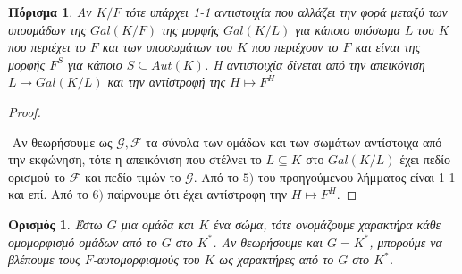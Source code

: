 \documentclass[oneside,a4paper]{article}
\newtheorem*{defn}{Ορισμός}
\newtheorem{cor}{Πόρισμα}
\begin{document}
\begin{cor} Αν $K/F$ τότε υπάρχει 1-1 αντιστοιχία που αλλάζει την φορά μεταξύ των υποομάδων της $Gal(K/F)$ της μορφής $Gal(K/L)$ για κάποιο υπόσωμα $L$ του $K$ που περιέχει το $F$ και των υποσωμάτων του $K$ που περιέχουν το $F$ και είναι της μορφής $F^S$ για κάποιο $S \subseteq Aut(K)$. Η αντιστοιχία δίνεται από την απεικόνιση $L \mapsto Gal(K/L)$ και την αντίστροφή της $H \mapsto F^H$
\end{cor}
\begin{proof} $ $

	$ $\newline
	Αν θεωρήσουμε ως $\mathcal G, \mathcal F$ τα σύνολα των ομάδων και των σωμάτων αντίστοιχα από την εκφώνηση, τότε η απεικόνιση που στέλνει το $L\subseteq K$ στο $Gal(K/L)$ έχει πεδίο ορισμού το $\mathcal F$ και πεδίο τιμών το $\mathcal G$. Από το $5)$ του προηγούμενου λήμματος είναι 1-1 και επί. Από το $6)$ παίρνουμε ότι έχει αντίστροφη την $H \mapsto F^H$.
	
\end{proof}


\begin{defn}
	Έστω $G$ μια ομάδα και $K$ ένα σώμα, τότε ονομάζουμε χαρακτήρα κάθε ομομορφισμό ομάδων από το $G$ στο $K^*$. Αν θεωρήσουμε και $G=K^*$, μπορούμε να βλέπουμε τους $F$-αυτομορφισμούς του $K$ ως χαρακτήρες από το $G$ στο $K^*$.
\end{defn}
\end{document}
